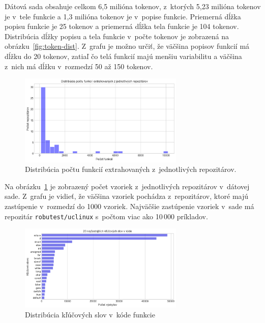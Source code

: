 Dátová sada obsahuje celkom 6,5 milióna tokenov, z~ktorých 5,23 milióna tokenov je v~tele funkcie a 1,3 milióna tokenov je v~popise funkcie. Priemerná dĺžka popisu funkcie je 25 tokenov a priemerná dĺžka tela funkcie je 104 tokenov. Distribúcia dĺžky popisu a tela funkcie v~počte tokenov je zobrazená na obrázku~\ref{fig:token-dist}. Z~grafu je možno určiť, že väčšina popisov funkcií má dĺžku do 20 tokenov, zatiaľ čo telá funkcií majú menšiu variabilitu a väčšina z~nich má dĺžku v~rozmedzí 50 až 150 tokenov.

\begin{figure}[!ht]
    \centering
    \includegraphics[width=0.7\textwidth]{obrazky/repo_dist.png}
    \caption{Distribúcia počtu funkcií extrahovaných z~jednotlivých repozitárov.}
    \label{fig:repo-dist}
\end{figure}

Na obrázku~\ref{fig:repo-dist} je zobrazený počet vzoriek z~jednotlivých repozitárov v~dátovej sade. Z~grafu je vidieť, že väčšina vzoriek pochádza z~repozitárov, ktoré majú zastúpenie v~rozmedzí do 1000 vzoriek. Najväčšie zastúpenie vzoriek v~sade má repozitár \texttt{robutest/uclinux} s~počtom viac ako 10\,000 príkladov.

\begin{figure}[!ht]
    \centering
    \includegraphics[width=0.7\textwidth]{obrazky/keyword_dist.png}
    \caption{Distribúcia kľúčových slov v~kóde funkcie}
    \label{fig:keyword-dist}
\end{figure}

